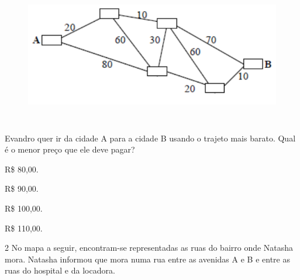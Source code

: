 {{{{\begin{figure}[H]
\centering\includegraphics[width=5.90625in,height=2.38542in]{./imgSAEB_6_MAT/media/image74.png}
\end{figure}

Evandro quer ir da cidade A para a cidade B usando o trajeto mais
barato.
Qual é o menor preço que ele deve pagar?

\begin{escolha}
\item R\$ 80,00.
\item R\$ 90,00.
\item R\$ 100,00.
\item R\$ 110,00.
\end{escolha}



\num{2} No mapa a seguir, encontram-se representadas as ruas do bairro onde
Natasha mora. Natasha informou que mora numa rua entre as avenidas A e B e entre as
ruas do hospital e da locadora.

}}}}
